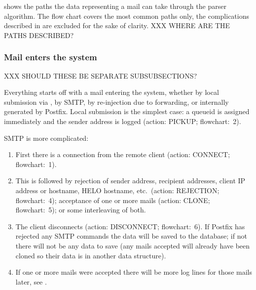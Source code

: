  shows the paths the data representing a mail
can take through the parser algorithm.  The flow chart covers the most
common paths only, the complications described in
 are excluded for the sake of clarity.  XXX WHERE
ARE THE PATHS DESCRIBED\@?


\clearpage

\subsubsection{Mail enters the system}

\label{mail-enters-the-system}

XXX SHOULD THESE BE SEPARATE SUBSUBSECTIONS\@?

Everything starts off with a mail entering the system, whether by local
submission via , by \gls{SMTP}, by re-injection due to
forwarding, or internally generated by Postfix.  Local submission is the
simplest case: a queueid is assigned immediately and the sender address is
logged (action: PICKUP\@; flowchart:~2).

\gls{SMTP} is more complicated:

\begin{enumerate}

    \item First there is a connection from the remote client (action:
        CONNECT\@; flowchart:~1).

    \item This is followed by rejection of sender address, recipient
        addresses, client \gls{IP} address or hostname, HELO hostname,
        etc.\ (action: REJECTION\@; flowchart:~4); acceptance of one or
        more mails (action: CLONE\@; flowchart:~5); or some interleaving of
        both.

    \item The client disconnects (action: DISCONNECT\@; flowchart:~6).  If
        Postfix has rejected any \gls{SMTP} commands the data will be saved
        to the database; if not there will not be any data to save (any
        mails accepted will already have been cloned so their data is in
        another data structure).

    \item If one or more mails were accepted there will be more log lines
        for those mails later, see .

\end{enumerate}

